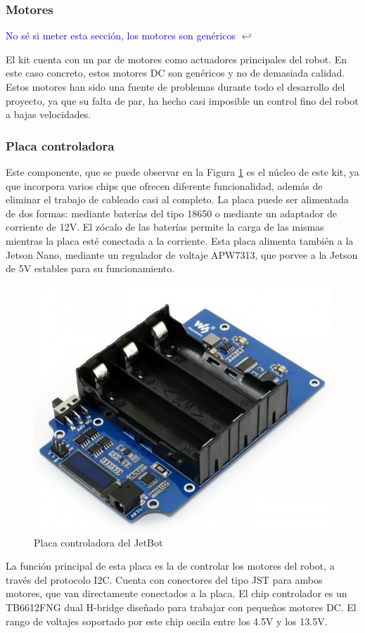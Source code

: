 \subsubsection{Motores}

\textcolor{blue}{No sé si meter esta sección, los motores son genéricos} $\hookleftarrow$

El kit cuenta con un par de motores como actuadores principales del robot. En este caso concreto, estos motores DC son genéricos y no de demasiada calidad. Estos motores han sido una fuente de problemas durante todo el desarrollo del proyecto, ya que su falta de par, ha hecho casi imposible un control fino del robot a bajas velocidades.

\subsubsection{Placa controladora}

Este componente, que se puede observar en la Figura \ref{fig:waveboard} es el núcleo de este kit, ya que incorpora varios chips que ofrecen diferente funcionalidad, además de eliminar el trabajo de cableado casi al completo. La placa puede ser alimentada de dos formas: mediante baterías del tipo 18650 o mediante un adaptador de corriente de 12V. El zócalo de las baterías permite la carga de las mismas mientras la placa esté conectada a la corriente. Esta placa alimenta también a la Jetson Nano, mediante un regulador de voltaje APW7313, que porvee a la Jetson de 5V estables para su funcionamiento.

\begin{figure}
  \centering
  \includegraphics[width=.5\linewidth]{img/waveshare_board}
  \caption{Placa controladora del JetBot}
  \label{fig:waveboard}
\end{figure}

La función principal de esta placa es la de controlar los motores del robot, a través del protocolo I2C. Cuenta con conectores del tipo JST para ambos motores, que van directamente conectados a la placa. El chip controlador es un TB6612FNG dual H-bridge diseñado para trabajar con pequeños motores DC. El rango de voltajes soportado por este chip oscila entre los 4.5V y los 13.5V.

